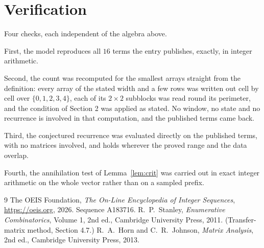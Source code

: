 \documentclass[11pt,a4paper]{article}
\theoremstyle{plain}
\theoremstyle{definition}
\begin{document}
\section{Verification}

Four checks, each independent of the algebra above.

First, the model reproduces all $16$ terms the entry publishes, exactly, in integer
arithmetic.

Second, the count was recomputed for the smallest arrays straight from the definition: every
array of the stated width and a few rows was written out cell by cell over $\{0,1,2,3,4\}$, each of
its $2\times2$ subblocks was read round its perimeter, and the condition of Section 2 was
applied as stated. No window, no state and no recurrence is involved in that computation, and
the published terms came back.

Third, the conjectured recurrence was evaluated directly on the published terms, with no
matrices involved, and holds wherever the proved range and the data overlap.

Fourth, the annihilation test of Lemma~\ref{lem:crit} was carried out in exact integer
arithmetic on the whole vector rather than on a sampled prefix.

\begin{thebibliography}{9}
 The OEIS Foundation, \emph{The On-Line Encyclopedia of Integer
Sequences}, \url{https://oeis.org}, 2026. Sequence A183716.
 R.~P.~Stanley, \emph{Enumerative Combinatorics}, Volume 1, 2nd ed.,
Cambridge University Press, 2011. (Transfer-matrix method, Section 4.7.)
 R.~A.~Horn and C.~R.~Johnson, \emph{Matrix Analysis}, 2nd ed., Cambridge
University Press, 2013.
\end{thebibliography}
\end{document}

